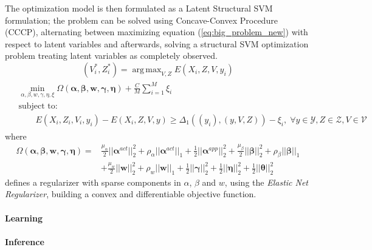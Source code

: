 \documentclass[10pt,letterpaper]{article}
\DeclareMathOperator*{\argmax}{arg\,max}
\newcommand{\+}[1]{\ensuremath{{\boldsymbol #1}}}
\begin{document}
The optimization model is then formulated as a Latent Structural SVM formulation; the problem can be
solved using Concave-Convex Procedure (CCCP), alternating between maximizing
equation (\ref{eq:big_problem_new}) with respect to latent variables and afterwards,
solving a structural SVM optimization problem treating
latent variables as completely observed. 
\begin{equation}
 (V_i^*,Z_i^*) = \argmax_{V,Z} E(X_i, Z, V, y_i)
\end{equation} 
\begin{align}
\label{eq:big_problem_new}
\begin{split}
& \min_{\alpha, \beta, w,\gamma,\eta, \xi}
      \Omega(\+{\alpha},\+{\beta},\+{w},\+{\gamma},\+{\eta})
 + \frac{C}{M} \sum_{i=1}^M \xi_i \\
& \text{subject to:} \\
& \quad\quad  E(X_i, Z_i, V_i, y_i) - E(X_i, Z, V, y)
      \geq \Delta_1( (y_i), (y, V, Z)) - \xi_i, \;
      \forall y \in \mathcal{Y}, Z \in \mathcal{Z},
      V \in \mathcal{V}
\end{split}
\end{align}
where
\begin{equation}
\begin{split}
\Omega(\+{\alpha},\+{\beta},\+{w},\+{\gamma},\+{\eta}) = &  \frac{\mu_{\alpha}}{2}||\+\alpha^{act}||_2^2 + \rho_{\alpha} ||\+\alpha^{act}||_1 + \frac{1}{2}||\+\alpha^{app}||_2^2 + \frac{\mu_{\beta}}{2}||\+\beta||_2^2 + \rho_{\beta} ||\+\beta||_1 \\
& +\frac{\mu_{w}}{2}||\+w||_2^2 + \rho_{w} ||\+w||_1 + \frac{1}{2}||\+\gamma||_2^2 +\frac{1}{2}||\+\eta||_2^2 + \frac{1}{2}||\+\theta||_2^2 
\end{split}
\end{equation}
defines a regularizer with sparse components in $\alpha$, $\beta$ and $w$, using the \emph{Elastic Net Regularizer}, building a convex and differentiable objective function. 

\paragraph{Learning}

\paragraph{Inference}
\end{document}
